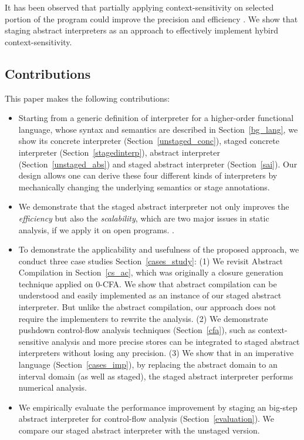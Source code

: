 It has been observed that partially applying context-sensitivity on selected portion of the program could
improve the precision and efficiency \cite{zipper2018, Kastrinis:2013:HCP:2491956.2462191}.
We show that staging abstract interpreters as an approach to effectively implement hybird context-sensitivity\todo{}.


\subsection{Contributions}

This paper makes the following contributions:

\begin{itemize}
  \item Starting from a generic definition of interpreter for a higher-order functional language,
    whose syntax and semantics are described in Section~\ref{bg_lang}, we show its concrete
    interpreter (Section~\ref{unstaged_conc}), staged concrete interpreter (Section~\ref{stagedinterp}), 
    abstract interpreter (Section~\ref{unstaged_abs}) and staged abstract interpreter (Section~\ref{sai}).
    Our design allows one can derive these four different kinds of interpreters by mechanically changing
    the underlying semantics or stage annotations.
  \item We demonstrate that the staged abstract interpreter not only improves the \textit{efficiency}
    but also the \textit{scalability}, which are two major issues in static analysis, if we apply it on open
    programs. .
  \item To demonstrate the applicability and usefulness of the proposed approach, we conduct three case studies 
    Section~\ref{cases_study}: 
    \subitem (1) We revisit Abstract Compilation \cite{Boucher:1996:ACN:647473.727587} in Section~\ref{cs_ac}, 
    which was originally a closure generation technique applied on 0-CFA.
    We show that abstract compilation can be understood and easily implemented as an instance of our staged abstract interpreter.
    But unlike the abstract compilation, our approach does not require the implementers to rewrite the analysis.
    \subitem (2) We demonstrate pushdown control-flow analysis techniques (Section~\ref{cfa}), such as context-sensitive 
    analysis and more precise stores can be integrated to staged abstract interpreters without losing any precision.
    \subitem (3) We show that in an imperative language (Section~\ref{cases_imp}), by replacing the abstract domain
    to an interval domain (as well as staged), the staged abstract interpreter performs numerical analysis.
  \item We empirically evaluate the performance improvement by staging an big-step abstract interpreter 
    for control-flow analysis (Section~\ref{evaluation}). 
    We compare our staged abstract interpreter with the unstaged version.
\end{itemize}
